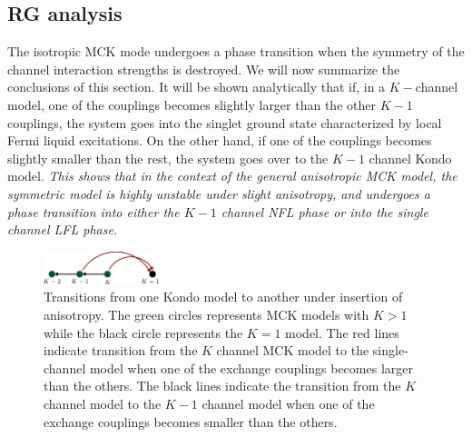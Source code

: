 \documentclass[reprint,prb,superscriptaddress]{revtex4-2}
\begin{document}
\subsection{RG analysis}
The isotropic MCK mode undergoes a phase transition when the symmetry of the channel interaction strengths is destroyed. We will now summarize the conclusions of this section. It will be shown analytically that if, in a \(K-\)channel model, one of the couplings becomes slightly larger than the other \(K-1\) couplings, the system goes into the singlet ground state characterized by local Fermi liquid excitations. On the other hand, if one of the couplings becomes slightly smaller than the rest, the system goes over to the \(K-1\) channel Kondo model. \textit{This shows that in the context of the general anisotropic MCK model, the symmetric model is highly unstable under slight anisotropy, and undergoes a phase transition into either the \(K-1\) channel NFL phase or into the single channel LFL phase.}
\begin{figure}[!htpb]
	\centering
	\includegraphics[width=0.3\textwidth]{plt/iqpt.pdf}
	\caption{Transitions from one Kondo model to another under insertion of anisotropy. The green circles represents MCK models with \(K>1\) while the black circle represents the \(K=1\) model. The red lines indicate transition from the \(K\) channel MCK model to the single-channel model when one of the exchange couplings becomes larger than the others. The black lines indicate the transition from the \(K\) channel model to the \(K-1\) channel model when one of the exchange couplings becomes smaller than the others.}
	\label{fig:-iqpt-pdf}
\end{figure}
\end{document}
